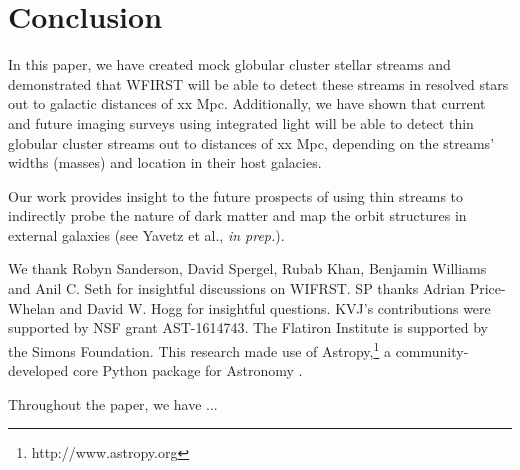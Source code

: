 \documentclass[twocolumn]{aastex62}
\newcommand{\package}[1]{\textsl{#1}}
\begin{document}
\section{Conclusion}\label{sec:conclusion}
In this paper, we have created mock globular cluster stellar streams and demonstrated that WFIRST will be able to detect these streams in resolved stars out to galactic distances of xx Mpc. Additionally, we have shown that current and future imaging surveys using integrated light will be able to detect thin globular cluster streams out to distances of xx Mpc, depending on the streams' widths (masses) and location in their host galacies. 

Our work provides insight to  the future prospects of using thin streams to indirectly probe the nature of dark matter and map the orbit structures in external galaxies (see Yavetz et al., {\it in prep.}).

\acknowledgements
We thank Robyn Sanderson, David Spergel, Rubab Khan, Benjamin Williams and Anil C. Seth for insightful discussions on WIFRST. SP thanks Adrian Price-Whelan and David W. Hogg for insightful questions. KVJ's contributions were supported by NSF grant AST-1614743. The Flatiron Institute is supported by the Simons Foundation. This research made use of Astropy,\footnote{http://www.astropy.org} a community-developed core Python package for Astronomy \citep{astropy:2013, astropy:2018}.

\appendix\label{sec:appendix}
Throughout the paper, we have ...



\software{
    \package{Astropy} \citep{astropy:2013, astropy:2018},
    \package{matplotlib} \citep{Hunter:2007},
    \package{numpy} \citep{walt2011},
}



\end{document}

